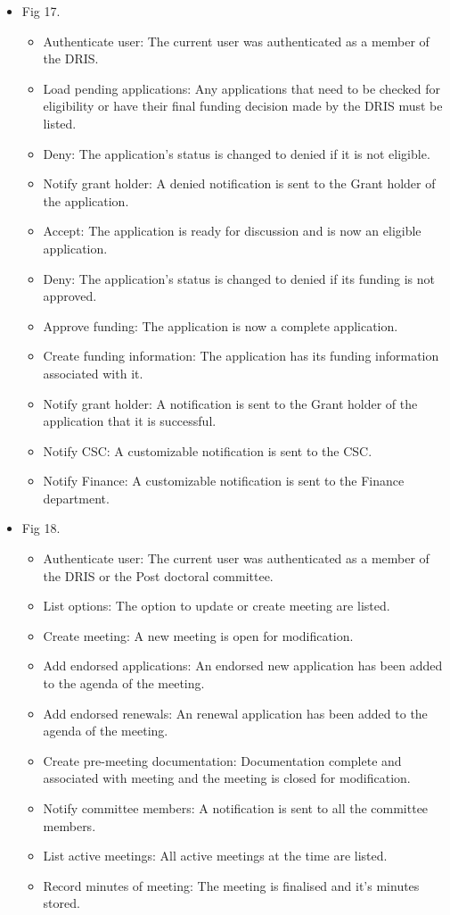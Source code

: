 \documentclass[12pt]{article}
\begin{document}
\begin{itemize}
	\item Fig 17.
		\begin{itemize}
			\item Authenticate user: The current user was authenticated as a member of the DRIS.
			\item Load pending applications: Any applications that need to be checked for eligibility or have their final funding decision made by the DRIS must be listed.
			\item Deny: The application's status is changed to denied if it is not eligible. 
			\item Notify grant holder: A denied notification is sent to the Grant holder of the application.
			\item Accept: The application is ready for discussion and is now an eligible application.			
			\item Deny: The application's status is changed to denied if its funding is not approved.			
			\item Approve funding: The application is now a complete application.
			\item Create funding information: The application has its funding information associated with it.
			\item Notify grant holder: A notification is sent to the Grant holder of the application that it is successful.
			\item Notify CSC: A customizable notification is sent to the CSC.
			\item Notify Finance: A customizable notification is sent to the Finance department.									
		\end{itemize}
	
	\item Fig 18.
		\begin{itemize}
			\item Authenticate user: The current user was authenticated as a member of the DRIS or the Post doctoral committee.
			\item List options: The option to update or create meeting are listed.
			\item Create meeting: A new meeting is open for modification.
			\item Add endorsed applications: An endorsed new application has been added to the agenda of the meeting.
			\item Add endorsed renewals: An renewal application has been added to the agenda of the meeting.
			\item Create pre-meeting documentation: Documentation complete and associated with meeting and the meeting is closed for modification.
			\item Notify committee members: A notification is sent to all the committee members.
			\item List active meetings: All active meetings at the time are listed.
			\item Record minutes of meeting: The meeting is finalised and it's minutes stored.							
		\end{itemize}

\end{itemize}
\end{document}

